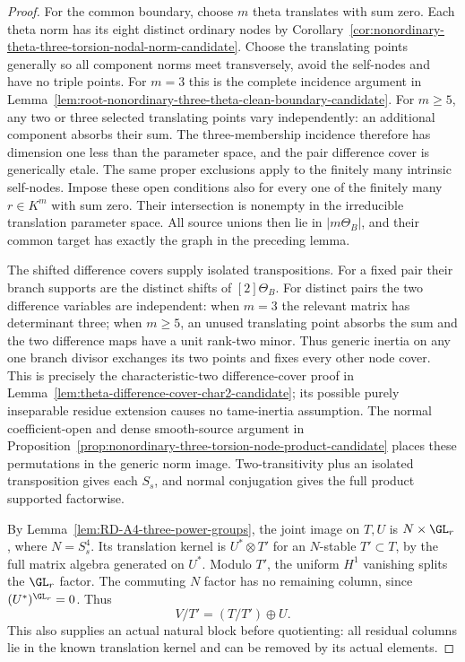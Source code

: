 \begin{proof}
For the common boundary, choose $m$ theta translates with sum
zero.  Each theta norm has its eight distinct ordinary nodes by
Corollary~\ref{cor:nonordinary-theta-three-torsion-nodal-norm-candidate}.
Choose the translating points generally so all component norms
meet transversely, avoid the self-nodes and have no triple points.
For $m=3$ this is the complete incidence argument in
Lemma~\ref{lem:root-nonordinary-three-theta-clean-boundary-candidate}.
For $m\ge5$, any two or three selected translating points vary
independently: an additional component absorbs their sum.
The three-membership incidence therefore has dimension one less
than the parameter space, and the pair difference cover is
generically etale.  The same proper exclusions apply to the
finitely many intrinsic self-nodes.  Impose these open conditions
also for every one of the finitely many $r\in K^m$ with sum zero.
Their intersection is nonempty in the irreducible translation
parameter space.  All source unions then lie in $|m\Theta_B|$,
and their common target has exactly the graph in the preceding lemma.

The shifted difference covers supply isolated transpositions.
For a fixed pair their branch supports are the distinct shifts
of $[2]\Theta_B$.  For distinct pairs the two difference variables
are independent: when $m=3$ the relevant matrix has determinant
three; when $m\ge5$, an unused translating point absorbs the sum
and the two difference maps have a unit rank-two minor.
Thus generic inertia on any one branch divisor exchanges its
two points and fixes every other node cover.  This is precisely
the characteristic-two difference-cover proof in
Lemma~\ref{lem:theta-difference-cover-char2-candidate}; its possible
purely inseparable residue extension causes no tame-inertia assumption.
The normal coefficient-open and dense smooth-source argument in
Proposition~\ref{prop:nonordinary-three-torsion-node-product-candidate}
places these permutations in the generic norm image.
Two-transitivity plus an isolated transposition gives each $S_s$,
and normal conjugation gives the full product supported factorwise.

By Lemma~\ref{lem:RD-A4-three-power-groups}, the joint image on
$T,U$ is $N\times\GL_r$, where $N=S_s^4$.
Its translation kernel is $U^*\otimes T'$ for an $N$-stable
$T'\subset T$, by the full matrix algebra generated on $U^*$.
Modulo $T'$, the uniform $H^1$ vanishing splits the $\GL_r$ factor.
The commuting $N$ factor has no remaining column, since
$(U^*)^{\GL_r}=0$.  Thus
\[
                         V/T'=(T/T')\oplus U.            \tag{RD-A4-3P.2}
\]
This also supplies an actual natural block before quotienting:
all residual columns lie in the known translation kernel and can
be removed by its actual elements.


\end{proof}
